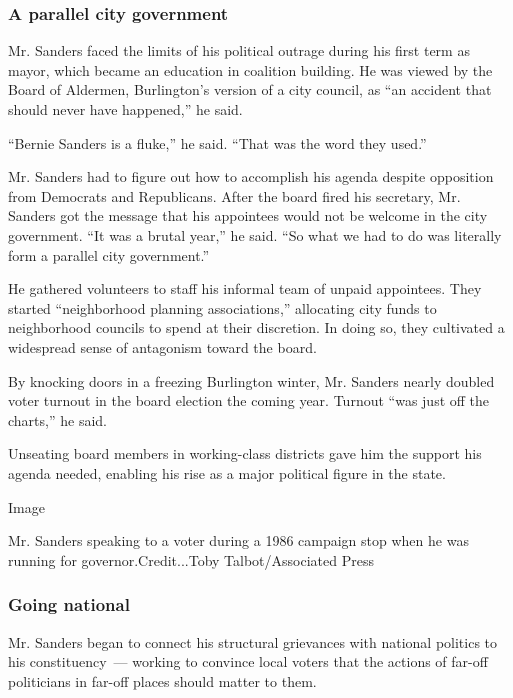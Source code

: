 \hypertarget{a-parallel-city-government}{%
\subsubsection{A parallel city
government}\label{a-parallel-city-government}}

Mr. Sanders faced the limits of his political outrage during his first
term as mayor, which became an education in coalition building. He was
viewed by the Board of Aldermen, Burlington's version of a city council,
as ``an accident that should never have happened,'' he said.

``Bernie Sanders is a fluke,'' he said. ``That was the word they used.''

Mr. Sanders had to figure out how to accomplish his agenda despite
opposition from Democrats and Republicans. After the board fired his
secretary, Mr. Sanders got the message that his appointees would not be
welcome in the city government. ``It was a brutal year,'' he said. ``So
what we had to do was literally form a parallel city government.''

He gathered volunteers to staff his informal team of unpaid appointees.
They started ``neighborhood planning associations,'' allocating city
funds to neighborhood councils to spend at their discretion. In doing
so, they cultivated a widespread sense of antagonism toward the board.

By knocking doors in a freezing Burlington winter, Mr. Sanders nearly
doubled voter turnout in the board election the coming year. Turnout
``was just off the charts,'' he said.

Unseating board members in working-class districts gave him the support
his agenda needed, enabling his rise as a major political figure in the
state.

Image

Mr. Sanders speaking to a voter during a 1986 campaign stop when he was
running for governor.Credit...Toby Talbot/Associated Press

\hypertarget{going-national}{%
\subsubsection{Going national}\label{going-national}}

Mr. Sanders began to connect his structural grievances with national
politics to his constituency~--- working to convince local voters that
the actions of far-off politicians in far-off places should matter to
them.

